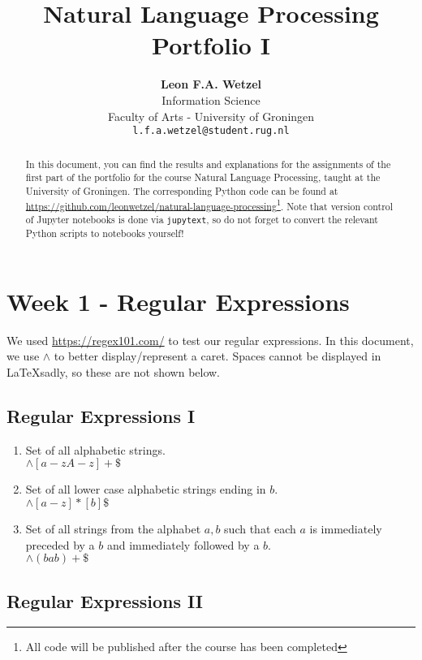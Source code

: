 \documentclass[a4paper, 11pt]{article}
\title{\textbf{Natural Language Processing}\\Portfolio I}
\author{\textbf{Leon F.A. Wetzel}\\ Information Science \\ Faculty of Arts - University of Groningen\\ \texttt{l.f.a.wetzel@student.rug.nl}}
\begin{document}
\maketitle

\begin{abstract}
	
	In this document, you can find the results and explanations for the assignments of the first part of the portfolio for the course Natural Language Processing, taught at the University of Groningen. The corresponding Python code can be found at \url{https://github.com/leonwetzel/natural-language-processing}\footnote{All code will be published after the course has been completed}. Note that version control of Jupyter notebooks is done via \texttt{jupytext}, so do not forget to convert the relevant Python scripts to notebooks yourself!

\end{abstract}

\section{Week 1 - Regular Expressions}

We used \url{https://regex101.com/} to test our regular expressions. In this document, we use \texttt{$\wedge$} to better display/represent a caret. Spaces cannot be displayed in \LaTeX  sadly, so these are not shown below.

\subsection{Regular Expressions I}

\begin{enumerate}
	\item Set of all alphabetic strings. \\ $ \wedge [a-zA-z ]+\$ $
	
	\item Set of all lower case alphabetic strings ending in $b$. \\ $\wedge [a-z ]*[b]\$ $
	
	\item Set of all strings from the alphabet ${a,b}$ such that each $a$ is immediately preceded by a $b$ and immediately followed by a $b$. \\$\wedge(bab)+\$ $
\end{enumerate}

\subsection{Regular Expressions II}
\end{document}
